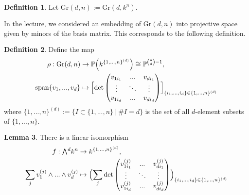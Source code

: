\documentclass{scrartcl}
\newcommand{\Proj}{\mathbb{P}}
\newcommand{\Gr}{\mathrm{Gr}}
\newcommand{\extpow}{\mathchoice{{\textstyle\bigwedge}}
    {{\bigwedge}}
    {{\textstyle\wedge}}
    {{\scriptstyle\wedge}}}
\newcommand{\vspan}{\mathrm{span}}
\theoremstyle{definition}
\newtheorem{definition}{Definition}
\newtheorem{lemma}[definition]{Lemma}
\begin{document}
\begin{definition}
    Let $\Gr(d, n) := \Gr(d, k^n)$.
\end{definition}
In the lecture, we considered an embedding of $\Gr(d, n)$ into projective space given by minors of the basis matrix.
This corresponds to the following definition.
\begin{definition}
    Define the map
    \begin{align*}
        \rho: \Gr(d, n) &\to \Proj\Bigl(k^{\{1, ..., n\}^{(d)}}\Bigr) \cong \Proj^{{n \choose d} - 1}, \\
        \vspan\{v_1, ..., v_d\} &\mapsto \Bigl[ \det\left(\begin{matrix}
            v_{1i_1} & ... & v_{di_1} \\
            \vdots & \ddots & \vdots \\
            v_{1i_d} & ... & v_{di_d}
        \end{matrix}\right) \Bigr]_{\{i_1, ..., i_d\} \in \{1, ..., n\}^{(d)}}
    \end{align*}
    where $\{1, ..., n\}^{(d)} := \{ I \subset \{1, ..., n\} \ | \ \#I = d \}$ is the set of all $d$-element subsets of $\{1, ..., n\}$.
\end{definition}
\begin{lemma}
    \label{prop:isomorphism_extpow_det}
    There is a linear isomorphism
    \begin{align*}
        f: \extpow^d k^n &\to k^{\{1, ..., n\}^{(d)}}, \\
        \sum_j v_1^{(j)} \wedge ... \wedge v_d^{(j)} &\mapsto \Bigl( \sum_j \det\left(\begin{matrix}
            v_{1i_1}^{(j)} & ... & v_{di_1}^{(j)} \\
            \vdots & \ddots & \vdots \\
            v_{1i_d}^{(j)} & ... & v_{di_d}^{(j)}
        \end{matrix}\right) \Bigr)_{\{i_1, ..., i_d\} \in \{1, ..., n\}^{(d)}}
    \end{align*}
\end{lemma}
\end{document}
